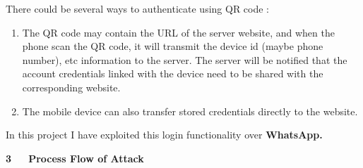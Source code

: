 \documentclass[12pt]{report}
\renewcommand{\_}{\kern-1.5pt\textunderscore\kern-1.5pt}
\begin{document}
\begin{FlushLeft}
\textcolor[HTML]{24292E}{There could be several ways to authenticate using QR code :}
\end{FlushLeft}\par

\begin{enumerate}
	\item \textcolor[HTML]{24292E}{The QR code may contain the URL of the server website, and when the phone scan the QR code, it will transmit the device id (maybe phone number), etc information to the server. The server will be notified that the account credentials linked with the device need to be shared with the corresponding website.}\par

	\item \textcolor[HTML]{24292E}{The mobile device can also transfer stored credentials directly to the website.}
\end{enumerate}\par

\begin{FlushLeft}
In this project I have exploited this login functionality over \textbf{WhatsApp.}
\end{FlushLeft}\par


\vspace{\baselineskip}

\vspace{\baselineskip}
\begin{FlushLeft}
{\fontsize{18pt}{21.6pt}\selectfont \textbf{3\ \ \  Process Flow of Attack}\par}
\end{FlushLeft}\par
\end{document}
